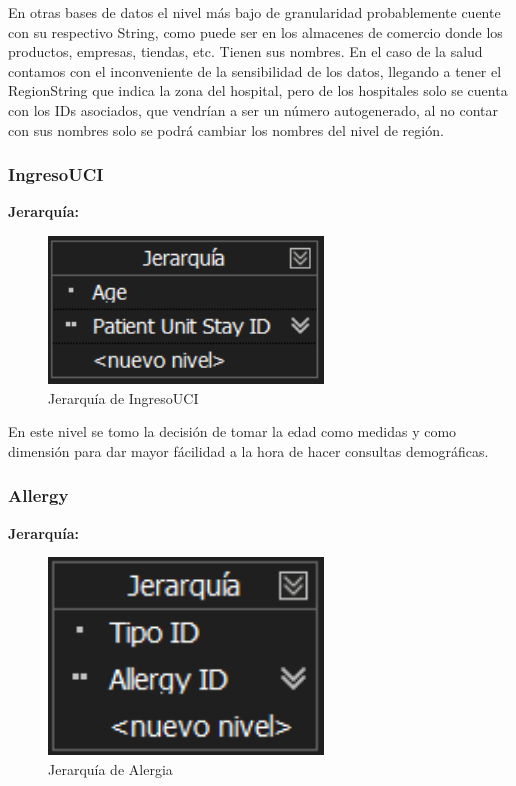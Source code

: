 \documentclass[12pt, a4paper, twoside]{article}
\begin{document}
En otras bases de datos el nivel más bajo de granularidad probablemente cuente con su respectivo String, como puede ser en los almacenes de comercio donde los productos, empresas, tiendas, etc. Tienen sus nombres. En el caso de la salud contamos con el inconveniente de la sensibilidad de los datos, llegando a tener el RegionString que indica la zona del hospital, pero de los hospitales solo se cuenta con los IDs asociados, que vendrían a ser un número autogenerado, al no contar con sus nombres solo se podrá cambiar los nombres del nivel de región.

\subsubsection{IngresoUCI}

\textbf{Jerarquía:}

\begin{figure}[H]
	\centering
	\includegraphics[width=0.65\textwidth]{image/JIngresoUCI}
	\caption{Jerarquía de IngresoUCI}
	\label{fig:17}
\end{figure}

En este nivel se tomo la decisión de tomar la edad como medidas y como dimensión para dar mayor fácilidad a la hora de hacer consultas demográficas.

\subsubsection{Allergy}

\textbf{Jerarquía:}

\begin{figure}[H]
	\centering
	\includegraphics[width=0.65\textwidth]{image/JAlergia}
	\caption{Jerarquía de Alergia}
	\label{fig:18}
\end{figure}
\end{document}

